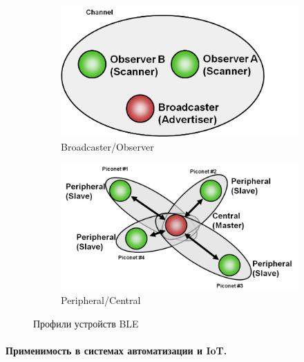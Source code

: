 \documentclass[a4paper,12pt]{article}
\begin{document}
\begin{figure}[htbp]
  \centering
  \begin{subfigure}[t]{0.45\textwidth}
    \centering
    \includegraphics[width=\linewidth]{images/BLE-topology-broadcast.png}
    \caption{Broadcaster/Observer}
    \label{fig:fig_BLE_topology_broadcast}
  \end{subfigure}\hfill
  \begin{subfigure}[t]{0.45\textwidth}
    \centering
    \includegraphics[width=\linewidth]{images/BLE-topology-unicast.png}
    \caption{Peripheral/Central}
    \label{fig:fig_BLE_topology_unicast}
  \end{subfigure}

  \caption{Профили устройств BLE\cite{IMG_BLE_topologies}}
  \label{fig:twophotos}
\end{figure}



\paragraph{Применимость в системах автоматизации и IoT.}
\end{document}
